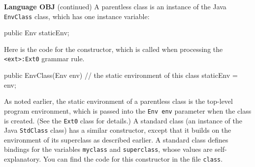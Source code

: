 \begin{minipage}[t]{\sw}
\slidenumber
\LARGE
{\bf Language OBJ} (continued)\exx
A parentless class is an instance of the Java \verb'EnvClass' class,
which has one instance variable:
\Large
\begin{qv}
    public Env staticEnv;
\end{qv}
\LARGE
Here is the code for the constructor,
which is called when processing the \verb'<ext>:Ext0' grammar rule.
\Large
\begin{qv}
public EnvClass(Env env) {
    // the static environment of this class
    staticEnv = env;
}
\end{qv}
\LARGE
As noted earlier, the static environment
of a parentless class is the top-level program environment,
which is passed into the \verb'Env env' parameter
when the class is created.
(See the \verb'Ext0' class for details.)\exx
A standard class (an instance of the Java \verb'StdClass' class)
has a similar constructor,
except that it builds on the environment of its superclass
as described earlier.
A standard class defines bindings
for the variables \verb'myclass' and \verb'superclass',
whose values are self-explanatory.
You can find the code for this constructor in the file \verb'class'.
\end{minipage}
